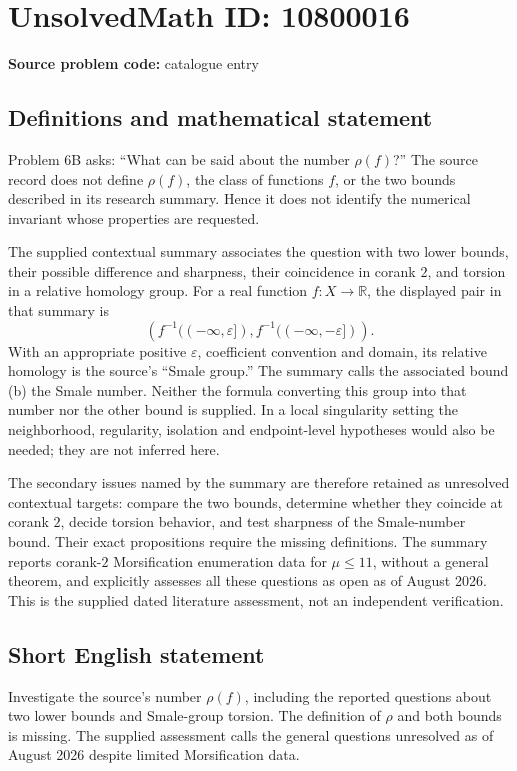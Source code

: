 \documentclass[11pt]{article}
\newcommand{\R}{\mathbb{R}}
\newcommand{\eps}{\varepsilon}
\begin{document}
\section*{UnsolvedMath ID: 10800016}
\textbf{Source problem code:} catalogue entry
\subsection{Definitions and mathematical statement}
Problem 6B asks: ``What can be said about the number \(\rho(f)\)?'' The source record does not define \(\rho(f)\), the class of functions \(f\), or the two bounds described in its research summary. Hence it does not identify the numerical invariant whose properties are requested.

The supplied contextual summary associates the question with two lower bounds, their possible difference and sharpness, their coincidence in corank \(2\), and torsion in a relative homology group. For a real function \(f:X\to\R\), the displayed pair in that summary is
\[
 \left(f^{-1}(( -\infty,\eps]),
       f^{-1}(( -\infty,-\eps])\right).
\]
With an appropriate positive \(\eps\), coefficient convention and domain, its relative homology is the source's ``Smale group.'' The summary calls the associated bound (b) the Smale number. Neither the formula converting this group into that number nor the other bound is supplied. In a local singularity setting the neighborhood, regularity, isolation and endpoint-level hypotheses would also be needed; they are not inferred here.

The secondary issues named by the summary are therefore retained as unresolved contextual targets: compare the two bounds, determine whether they coincide at corank \(2\), decide torsion behavior, and test sharpness of the Smale-number bound. Their exact propositions require the missing definitions. The summary reports corank-\(2\) Morsification enumeration data for \(\mu\le11\), without a general theorem, and explicitly assesses all these questions as open as of August 2026. This is the supplied dated literature assessment, not an independent verification.
\subsection{Short English statement}
Investigate the source's number \(\rho(f)\), including the reported questions about two lower bounds and Smale-group torsion. The definition of \(\rho\) and both bounds is missing. The supplied assessment calls the general questions unresolved as of August 2026 despite limited Morsification data.
\end{document}
